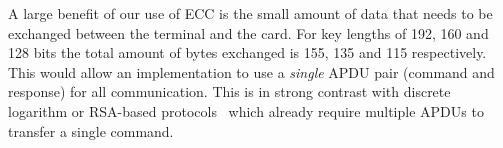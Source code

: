 A large benefit of our use of ECC is the small amount of data that needs to be
exchanged between the terminal and the card. For key lengths of 192, 160 and 128
bits the total amount of bytes exchanged is 155, 135 and 115 respectively. This
would allow an implementation to use a \emph{single} APDU pair (command and
response) for all communication. This is in strong contrast with discrete
logarithm or RSA-based protocols~\cite{Sterckx09,TewsJacobs09} which already
require multiple APDUs to transfer a single command.

%
%
